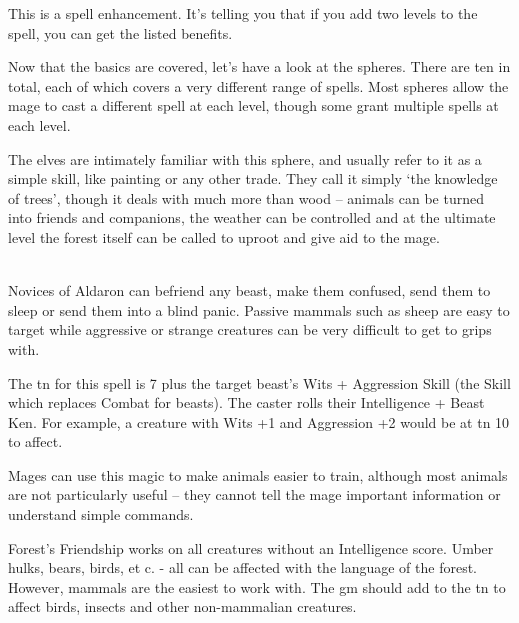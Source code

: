 \begin{multicols}{2}

This is a spell enhancement.  It's telling you that if you add two levels to the spell, you can get the listed benefits.

\vspace{.3in} 

\noindent Now that the basics are covered, let's have a look at the \glspl{sphere}. There are ten in total, each of which covers a very different range of spells. Most \glspl{sphere} allow the mage to cast a different spell at each level, though some grant multiple spells at each level.

\end{multicols}


\begin{multicols}{2}

The elves are intimately familiar with this sphere, and usually refer to it as a simple skill, like painting or any other trade. They call it simply `the knowledge of trees', though it deals with much more than wood -- animals can be turned into friends and companions, the weather can be controlled and at the ultimate level the forest itself can be called to uproot and give aid to the mage.

\spelllevel

\\
Novices of Aldaron can befriend any beast, make them confused, send them to sleep or send them into a blind panic.
Passive mammals such as sheep are easy to target while aggressive or strange creatures can be very difficult to get to grips with.

The \gls{tn} for this spell is 7 plus the target beast's Wits + Aggression Skill (the Skill which replaces Combat for beasts). The caster rolls their Intelligence + Beast Ken. For example, a creature with Wits +1 and Aggression +2 would be at \gls{tn} 10 to affect.

Mages can use this magic to make animals easier to train, although most animals are not particularly useful -- they cannot tell the mage important information or understand simple commands.

Forest's Friendship works on all creatures without an Intelligence score. Umber hulks, bears, birds, et c. - all can be affected with the language of the forest. However, mammals are the easiest to work with. The \gls{gm} should add to the \gls{tn} to affect birds, insects and other non-mammalian creatures.


\end{multicols}
